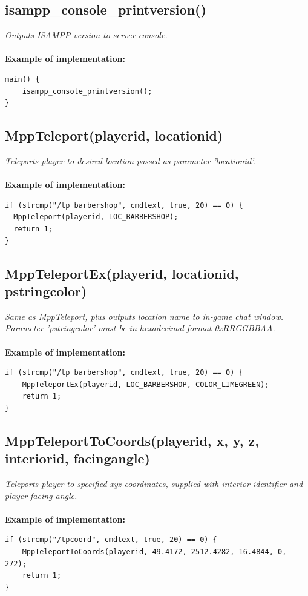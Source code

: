 \documentclass{article}
\begin{document}
\subsection{isampp\_console\_printversion()}

\textit{Outputs ISAMPP version to server console.}
\\
\\
\textbf{Example of implementation:}
\begin{verbatim}
main() {
    isampp_console_printversion();
}
\end{verbatim}



\subsection{MppTeleport(playerid, locationid)}

\textit{Teleports player to desired location passed as parameter 'locationid'.}
\\
\\
\textbf{Example of implementation:}
\begin{verbatim}
if (strcmp("/tp barbershop", cmdtext, true, 20) == 0) {
  MppTeleport(playerid, LOC_BARBERSHOP);
  return 1;
}
\end{verbatim}


\subsection{MppTeleportEx(playerid, locationid, pstringcolor)}

\textit{Same as MppTeleport, plus outputs location name to in-game chat window. \\Parameter 'pstringcolor' must be in hexadecimal format 0xRRGGBBAA.}
\\
\\
\textbf{Example of implementation:}
\begin{verbatim}
if (strcmp("/tp barbershop", cmdtext, true, 20) == 0) {
    MppTeleportEx(playerid, LOC_BARBERSHOP, COLOR_LIMEGREEN);
    return 1;
}
\end{verbatim}


\subsection{MppTeleportToCoords(playerid, x, y, z, interiorid, facingangle)}

\textit{Teleports player to specified xyz coordinates, supplied with interior identifier and player facing angle.}
\\
\\
\textbf{Example of implementation:}
\begin{verbatim}
if (strcmp("/tpcoord", cmdtext, true, 20) == 0) {
    MppTeleportToCoords(playerid, 49.4172, 2512.4282, 16.4844, 0, 272);
    return 1;
}
\end{verbatim}
\end{document}
